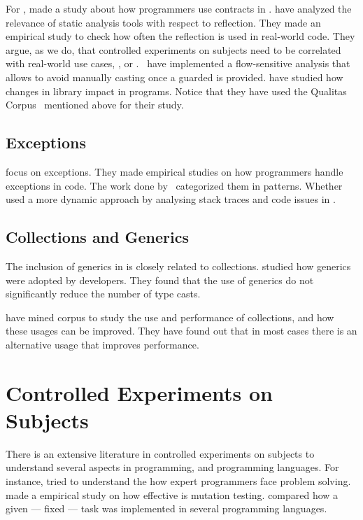 \documentclass{usiinfdocprop}
\begin{document}
For \java{}, \cite{dietrich_contracts_2017-1} made a study about how programmers use contracts in \mavencentral{}.
\cite{landman_challenges_2017} have analyzed the relevance of static analysis tools with respect to reflection.
They made an empirical study to check how often the reflection \api{} is used in real-world code.
They argue, as we do, that controlled experiments on subjects need to be correlated with real-world use cases, \eg{}, \github{} or \mavencentral{}.
\cite{winther_guarded_2011} ~have implemented a flow-sensitive analysis that allows to avoid manually casting once a guarded \instanceof{} is provided.
\cite{dietrich_broken_2014} have studied how changes in \api{} library impact in \java{} programs.
Notice that they have used the Qualitas Corpus~\cite{tempero_qualitas_2010} mentioned above for their study.

\subsection*{Exceptions}
\label{sec:org340d20f}
\cite{kery_examining_2016,asaduzzaman_how_2016} focus on exceptions.
They made empirical studies on how programmers handle exceptions in \java{} code.
The work done by~\cite{nakshatri_analysis_2016} categorized them in patterns.
Whether~\cite{coelho_unveiling_2015} used a more dynamic approach by analysing stack traces and code issues in \github{}.

\subsection*{Collections and Generics}
\label{sec:org3344249}
The inclusion of generics in \java{} is closely related to collections.
\cite{parnin_java_2011,parnin_adoption_2013} studied how generics were adopted by \java{} developers.
They found that the use of generics do not significantly reduce the number of type casts.

\cite{costa_empirical_2017} have mined \github{} corpus to study the use and performance of collections, and how these usages can be improved.
They have found out that in most cases there is an alternative usage that improves performance.

\section{Controlled Experiments on Subjects \label{org7313da4}}
\label{sec:org72305a5}
There is an extensive literature \perse{} in controlled experiments on subjects to understand several aspects in programming, and programming languages.
For instance, \cite{soloway_empirical_1984} tried to understand the how expert programmers face problem solving.
\cite{budd_theoretical_1980} made a empirical study on how effective is mutation testing.
\cite{prechelt_empirical_2000} compared how a given --- fixed --- task was implemented in several programming languages.
\end{document}
